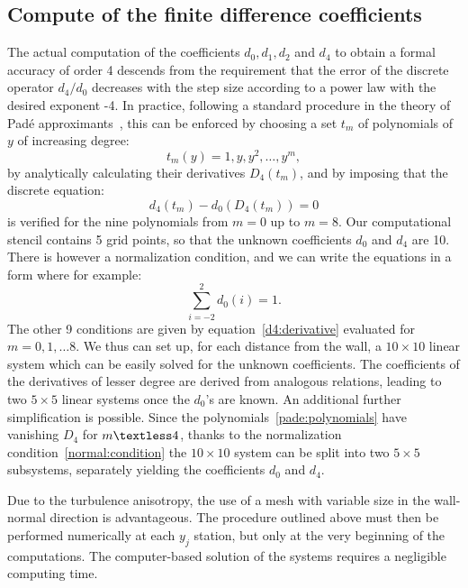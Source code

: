 \subsection{Compute of the finite difference coefficients}
The actual computation of the coefficients $d_{0}, d_{1}, d_{2}$ and $d_{4}$ to obtain a formal accuracy of order 4 descends from the requirement that the error of the discrete operator $d_{4} / d_{0}$
decreases with the step size according to a power law with the desired exponent -4. In practice, following a standard procedure in the theory of Padé approximants~\cite{Pade:approximants}, this can be enforced by choosing a set $t_{m}$ of polynomials of $y$ of increasing degree:
\begin{equation}
\label{pade:polynomials}
t_{m} (y) = 1, y, y^{2}, \dots , y^{m},
\end{equation}
 by analytically calculating their derivatives $D_{4}(t_{m})$, and by imposing that the discrete
equation:
\begin{equation}
\label{d4:derivative}
d_{4} (t_{m}) - d_{0} (D_{4}(t_{m})) = 0
\end{equation}
is verified for the nine polynomials from $m = 0$ up to $m = 8$.
Our computational stencil contains 5 grid points, so that the unknown coefficients $d_{0}$ and
$d_{4}$ are 10. There is however a normalization condition, and we can write the equations in a form where for example:
\begin{equation}
\label{normal:condition}
\sum_{i=-2}^{2} d_{0}(i) = 1.
\end{equation}
The other 9 conditions are given by equation~\ref{d4:derivative} evaluated for $m = 0, 1, \dots 8$. We thus can set up, for each distance from the wall, a $10\times10$ linear system which can be easily solved for the unknown coefficients. 
The coefficients of the derivatives of lesser degree are derived from analogous relations, leading to two $5\times5$ linear systems once the $d_{0}$’s are known. An additional further simplification is possible. Since the polynomials~\ref{pade:polynomials} have vanishing $D_{4}$ for $m \textless 4$, thanks to the normalization condition~\ref{normal:condition} the $10\times10$ system can be split into two $5\times5$ subsystems, separately yielding the coefficients $d_{0}$ and $d_{4}$.\par
Due to the turbulence anisotropy, the use of a mesh with variable size in the wall-normal direction is advantageous. The procedure outlined above must then be performed numerically at each $y_{j}$ station, but only at the very beginning of the computations. The computer-based solution of the systems requires a negligible computing time.\par
